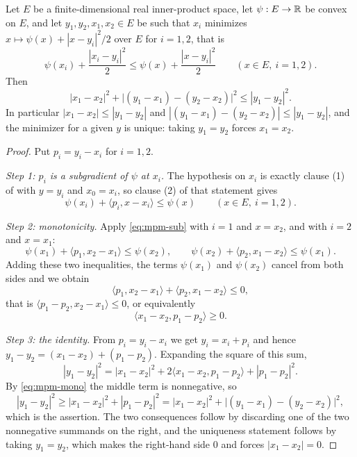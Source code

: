 \begin{lemma}
Let $E$ be a finite-dimensional real inner-product space, let $\psi:E\to\mathbb{R}$ be
convex on $E$, and let $y_1,y_2,x_1,x_2\in E$ be such that $x_i$ minimizes
$x\mapsto\psi(x)+|x-y_i|^2/2$ over $E$ for $i=1,2$, that is
\[
  \psi(x_i)+\frac{|x_i-y_i|^2}{2}\le\psi(x)+\frac{|x-y_i|^2}{2}
  \qquad(x\in E,\ i=1,2).
\]
Then
\[
  |x_1-x_2|^2+\bigl|(y_1-x_1)-(y_2-x_2)\bigr|^2\le|y_1-y_2|^2 .
\]
In particular $|x_1-x_2|\le|y_1-y_2|$ and
$|(y_1-x_1)-(y_2-x_2)|\le|y_1-y_2|$, and the minimizer for a given $y$ is
unique: taking $y_1=y_2$ forces $x_1=x_2$.
\end{lemma}
\begin{proof}
Put $p_i=y_i-x_i$ for $i=1,2$.

\emph{Step 1: $p_i$ is a subgradient of $\psi$ at $x_i$.}
The hypothesis on $x_i$ is exactly clause (1) of 
with $y=y_i$ and $x_0=x_i$, so clause (2) of that statement gives
\begin{equation}\label{eq:mpm-sub}
  \psi(x_i)+\langle p_i,x-x_i\rangle\le\psi(x)\qquad(x\in E,\ i=1,2).
\end{equation}

\emph{Step 2: monotonicity.}
Apply \eqref{eq:mpm-sub} with $i=1$ and $x=x_2$, and with $i=2$ and $x=x_1$:
\[
  \psi(x_1)+\langle p_1,x_2-x_1\rangle\le\psi(x_2),
  \qquad
  \psi(x_2)+\langle p_2,x_1-x_2\rangle\le\psi(x_1).
\]
Adding these two inequalities, the terms $\psi(x_1)$ and $\psi(x_2)$ cancel from
both sides and we obtain
\[
  \langle p_1,x_2-x_1\rangle+\langle p_2,x_1-x_2\rangle\le0,
\]
that is $\langle p_1-p_2,x_2-x_1\rangle\le0$, or equivalently
\begin{equation}\label{eq:mpm-mono}
  \langle x_1-x_2,p_1-p_2\rangle\ge0 .
\end{equation}

\emph{Step 3: the identity.}
From $p_i=y_i-x_i$ we get $y_i=x_i+p_i$ and hence
$y_1-y_2=(x_1-x_2)+(p_1-p_2)$. Expanding the square of this sum,
\[
  |y_1-y_2|^2=|x_1-x_2|^2+2\langle x_1-x_2,p_1-p_2\rangle+|p_1-p_2|^2 .
\]
By \eqref{eq:mpm-mono} the middle term is nonnegative, so
\[
  |y_1-y_2|^2\ge|x_1-x_2|^2+|p_1-p_2|^2
   =|x_1-x_2|^2+\bigl|(y_1-x_1)-(y_2-x_2)\bigr|^2,
\]
which is the assertion. The two consequences follow by discarding one of the two
nonnegative summands on the right, and the uniqueness statement follows by
taking $y_1=y_2$, which makes the right-hand side $0$ and forces
$|x_1-x_2|=0$.
\end{proof}
